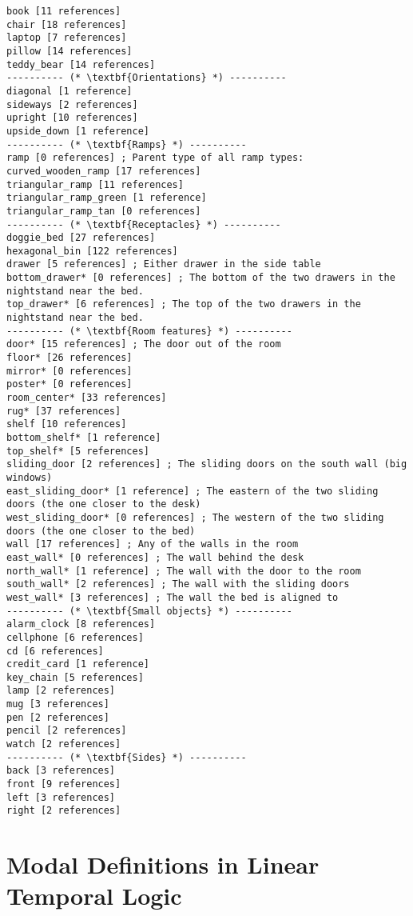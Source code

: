 \documentclass{article}
\begin{document}
\begin{lstlisting}
book [11 references]
chair [18 references]
laptop [7 references]
pillow [14 references]
teddy_bear [14 references]
---------- (* \textbf{Orientations} *) ----------
diagonal [1 reference]
sideways [2 references]
upright [10 references]
upside_down [1 reference]
---------- (* \textbf{Ramps} *) ----------
ramp [0 references] ; Parent type of all ramp types:
curved_wooden_ramp [17 references]
triangular_ramp [11 references]
triangular_ramp_green [1 reference]
triangular_ramp_tan [0 references]
---------- (* \textbf{Receptacles} *) ----------
doggie_bed [27 references]
hexagonal_bin [122 references]
drawer [5 references] ; Either drawer in the side table
bottom_drawer* [0 references] ; The bottom of the two drawers in the nightstand near the bed.
top_drawer* [6 references] ; The top of the two drawers in the nightstand near the bed.
---------- (* \textbf{Room features} *) ----------
door* [15 references] ; The door out of the room
floor* [26 references]
mirror* [0 references]
poster* [0 references]
room_center* [33 references]
rug* [37 references]
shelf [10 references]
bottom_shelf* [1 reference]
top_shelf* [5 references]
sliding_door [2 references] ; The sliding doors on the south wall (big windows)
east_sliding_door* [1 reference] ; The eastern of the two sliding doors (the one closer to the desk)
west_sliding_door* [0 references] ; The western of the two sliding doors (the one closer to the bed)
wall [17 references] ; Any of the walls in the room
east_wall* [0 references] ; The wall behind the desk
north_wall* [1 reference] ; The wall with the door to the room
south_wall* [2 references] ; The wall with the sliding doors
west_wall* [3 references] ; The wall the bed is aligned to
---------- (* \textbf{Small objects} *) ----------
alarm_clock [8 references]
cellphone [6 references]
cd [6 references]
credit_card [1 reference]
key_chain [5 references]
lamp [2 references]
mug [3 references]
pen [2 references]
pencil [2 references]
watch [2 references]
---------- (* \textbf{Sides} *) ----------
back [3 references]
front [9 references]
left [3 references]
right [2 references]
\end{lstlisting}




\section{Modal Definitions in Linear Temporal Logic}
\label{sec:LTL}
\end{document}
